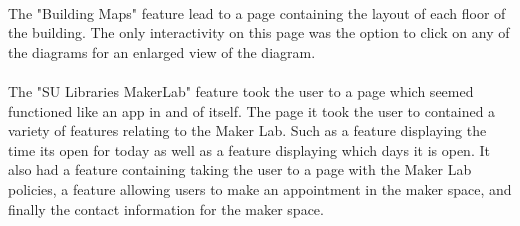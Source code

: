             \paragraph{}
            The "Building Maps" feature lead to a page containing the layout of each floor of the building. The only interactivity on this page was the option to click on any of the diagrams for an enlarged view of the diagram. 
            \paragraph{}
            The "SU Libraries MakerLab" feature took the user to a page which seemed functioned like an app in and of itself. The page it took the user to contained a variety of features relating to the Maker Lab. Such as a feature displaying the time its open for today as well as a feature displaying which days it is open. It also had a feature containing taking the user to a page with the Maker Lab policies, a feature allowing users to make an appointment in the maker space, and finally the contact information for the maker space. 